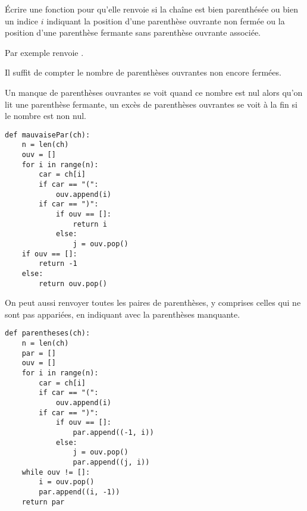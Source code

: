 \begin{Exercise}[title = {Test de parenthésage bis}]\it

Écrire une fonction  pour qu'elle renvoie  si la chaîne est bien parenthésée ou bien un indice $i$ indiquant la position d'une parenthèse ouvrante non fermée ou la position d'une parenthèse fermante sans parenthèse ouvrante associée.

Par exemple  renvoie .
\end{Exercise} 
\begin{Answer}

Il suffit de compter le nombre de parenthèses ouvrantes non encore fermées.

Un manque de parenthèses ouvrantes se voit quand ce nombre est nul alors qu'on lit une parenthèse fermante, un excès de parenthèses ouvrantes se voit à la fin si le nombre est non nul.
\begin{lstlisting}
def mauvaisePar(ch):
    n = len(ch)
    ouv = []
    for i in range(n):
        car = ch[i]
        if car == "(":
            ouv.append(i)
        if car == ")":
            if ouv == []:
                return i
            else:
                j = ouv.pop()
    if ouv == []:
        return -1
    else:
        return ouv.pop()
\end{lstlisting}

On peut aussi renvoyer toutes les paires de parenthèses, y comprises celles qui ne sont pas appariées, en indiquant avec  la parenthèses manquante.

\begin{lstlisting}
def parentheses(ch):
    n = len(ch)
    par = []
    ouv = []
    for i in range(n):
        car = ch[i]
        if car == "(":
            ouv.append(i)
        if car == ")":
            if ouv == []:
                par.append((-1, i))
            else:
                j = ouv.pop()
                par.append((j, i))
    while ouv != []:
        i = ouv.pop()
        par.append((i, -1))
    return par
\end{lstlisting}

\end{Answer}

